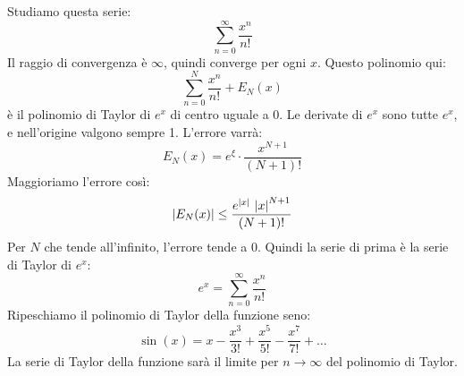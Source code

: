 Studiamo questa serie:
\[
\sum_{n = 0}^{\infty} \frac{x^n}{n!}
\]
Il raggio di convergenza \`e $\infty$, quindi converge per ogni $x$. Questo polinomio qui:
\[
\sum_{n = 0}^{N} \frac{x^n}{n!} + E_N (x)
\]
\`e il polinomio di Taylor di $e^x$ di centro uguale a 0. Le derivate di $e^x$ sono tutte $e^x$, e nell'origine valgono sempre 1. L'errore varr\`a:
\[
E_N (x) = e^\xi \cdot \frac{x^{N+1}}{(N+1)!}
\]
Maggioriamo l'errore cos\`i:
\[
\abs{E_N (x)} \le \frac{e^{\abs{x}} \, \abs{x}^{N+1}}{(N + 1)!}
\]
Per $N$ che tende all'infinito, l'errore tende a 0. Quindi la serie di prima \`e la serie di Taylor di $e^x$:
\[
e^x = \sum_{n = 0}^{\infty} \frac{x^n}{n!}
\]
Ripeschiamo il polinomio di Taylor della funzione seno:
\[
\sin (x) = x - \frac{x^3}{3!} + \frac{x^5}{5!} - \frac{x^7}{7!} + \ldots
\]
La serie di Taylor della funzione sar\`a il limite per $n \to \infty$ del polinomio di Taylor.




























